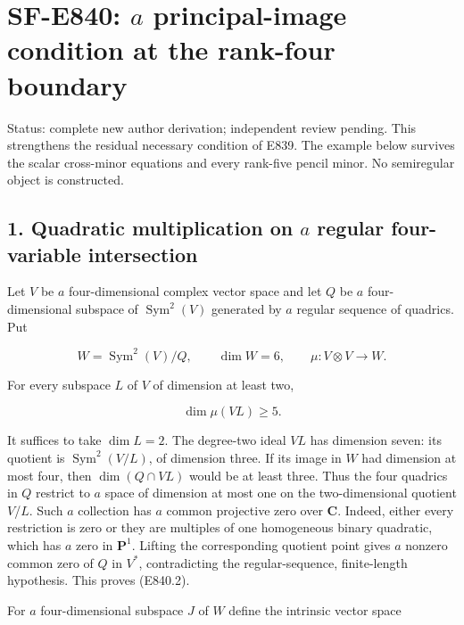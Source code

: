 \section{\texorpdfstring{SF-E840: \(a\) principal-image condition at the
rank-four
boundary}{SF-E840: a principal-image condition at the rank-four boundary}}\label{SF-E840:sf-e840-a-principal-image-condition-at-the-rank-four-boundary}

Status: complete new author derivation; independent review pending. This
strengthens the residual necessary condition of E839. The example below
survives the scalar cross-minor equations and every rank-five pencil
minor. No semiregular object is constructed.

\subsection{\texorpdfstring{1. Quadratic multiplication on \(a\) regular
four-variable
intersection}{1. Quadratic multiplication on a regular four-variable intersection}}\label{SF-E840:quadratic-multiplication-on-a-regular-four-variable-intersection}

Let \(V\) be \(a\) four-dimensional complex vector space and let \(Q\)
be \(a\) four-dimensional subspace of \(\operatorname{Sym}^2(V)\)
generated by \(a\) regular sequence of quadrics. Put

\[
 W=\operatorname{Sym}^2(V)/Q,
 \qquad \dim W=6,
 \qquad \mu:V\otimes V\longrightarrow W.
 \tag{E840.1}
\]

For every subspace \(L\) of \(V\) of dimension at least two,

\[
                     \dim\mu(VL)\ge5.
 \tag{E840.2}
\]

It suffices to take \(\dim L=2\). The degree-two ideal \(VL\) has
dimension seven: its quotient is \(\operatorname{Sym}^2(V/L)\), of
dimension three. If its image in \(W\) had dimension at most four, then
\(\dim(Q\cap VL)\) would be at least three. Thus the four quadrics in
\(Q\) restrict to \(a\) space of dimension at most one on the
two-dimensional quotient \(V\)/\(L\). Such \(a\) collection has \(a\)
common projective zero over \(\mathbf C\). Indeed, either every
restriction is zero or they are multiples of one homogeneous binary
quadratic, which has \(a\) zero in \(\mathbf P^1\). Lifting the
corresponding quotient point gives \(a\) nonzero common zero of \(Q\) in
\(V^*\), contradicting the regular-sequence, finite-length hypothesis.
This proves (E840.2).

For \(a\) four-dimensional subspace \(J\) of \(W\) define the intrinsic
vector space

